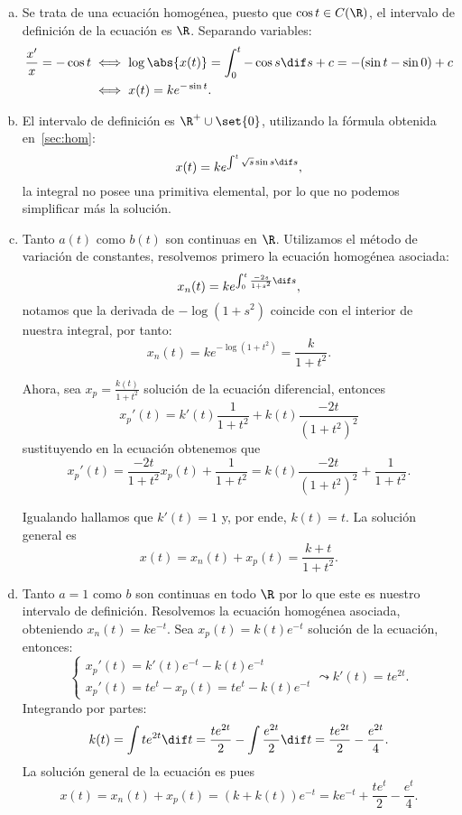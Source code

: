 \documentclass[../main.tex]{subfiles}
\begin{document}
\begin{solution}
	\begin{enumerate}[a), wide, labelwidth=0pt, labelindent=0pt]
		\item Se trata de una ecuación homogénea, puesto que 
			\(\cos t \in C(\R)\), el intervalo de definición de la ecuación es
			\(\R\). Separando variables:
			\begin{align*}
				\frac{x'}{x} = -\cos t &\iff 
				\log\abs{x(t)} = \int_0^t -\cos s \dif s + c 
				= -(\sin t - \sin 0) + c \\
				&\iff x(t) = k e^{-\sin t}.
			\end{align*}

		\item El intervalo de definición es \(\R^+ \cup \set{0}\), utilizando la
			fórmula obtenida en~\ref{sec:hom}:
			\[x(t) = k e^{\int^t \sqrt{s} \sin s \dif s},\]
			la integral no posee una primitiva elemental, por lo que no podemos
			simplificar más la solución.

		\item Tanto \(a(t)\) como \(b(t)\) son continuas en \(\R\). Utilizamos
			el método de variación de constantes, resolvemos primero la ecuación
			homogénea asociada:
			\[x_n(t) = k e^{\int_0^t \frac{-2s}{1 + s^2} \dif s},\]
			notamos que la derivada de \(-\log(1 + s^2)\) coincide con el
			interior de nuestra integral, por tanto:
			\[x_n(t) = k e^{-\log(1 + t^2)} = \frac{k}{1 + t^2}.\]

			Ahora, sea \(x_p = \frac{k(t)}{1 + t^2}\) solución de la ecuación
			diferencial, entonces
			\[x_p'(t) = k'(t)\frac{1}{1 + t^2} + k(t)\frac{-2t}{(1 + t^2)^2}\]
			sustituyendo en la ecuación obtenemos que
			\[x_p'(t) = \frac{-2t}{1 + t^2} x_p(t) + \frac{1}{1 + t^2}
				= k(t)\frac{-2t}{(1 + t^2)^2}  + \frac{1}{1 + t^2}.\]

			Igualando hallamos que \(k'(t) = 1\) y, por ende, \(k(t) = t\).
			La solución general es
			\[x(t) = x_n(t) + x_p(t) = \frac{k + t}{1 + t^2}.\]

		\item Tanto \(a = 1\) como \(b\) son continuas en todo \(\R\) por lo que
			este es nuestro intervalo de definición. Resolvemos la ecuación
			homogénea asociada, obteniendo \(x_n(t) = k e^{-t}\). Sea 
			\(x_p(t) = k(t) e^{-t}\) solución de la ecuación, entonces:
			\[\begin{cases}
				x_p'(t) = k'(t) e^{-t} - k(t) e^{-t} \\
				x_p'(t) = t e^t - x_p(t) = t e^t - k(t) e^{-t}
			  \end{cases}
			  \leadsto
			  k'(t) = t e^{2t}.
			\]
			Integrando por partes:
			\[k(t) = \int t e^{2t} \dif t 
				= \frac{t e^{2t}}{2} - \int \frac{e^{2t}}{2} \dif t
				= \frac{t e^{2t}}{2} - \frac{e^{2t}}{4}.\]
			La solución general de la ecuación es pues
			\[x(t) = x_n(t) + x_p(t) = (k + k(t))e^{-t}
				= k e^{-t} + \frac{t e^{t}}{2} - \frac{e^{t}}{4}.\]
	\end{enumerate}
\end{solution}
\end{document}
